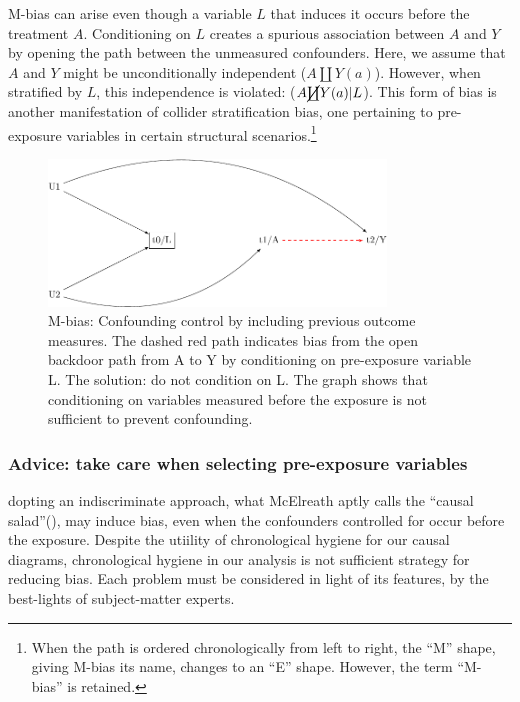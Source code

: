 \documentclass[
  singlecolumn,
  9pt]{article}
\begin{document}
M-bias can arise even though a variable \(L\) that induces it occurs
before the treatment \(A\). Conditioning on \(L\) creates a spurious
association between \(A\) and \(Y\) by opening the path between the
unmeasured confounders. Here, we assume that \(A\) and \(Y\) might be
unconditionally independent (\(A \coprod Y(a)\)). However, when
stratified by \(L\), this independence is violated:
(\(A \cancel{\coprod} Y(a)| L\)). This form of bias is another
manifestation of collider stratification bias, one pertaining to
pre-exposure variables in certain structural scenarios.\footnote{When
  the path is ordered chronologically from left to right, the ``M''
  shape, giving M-bias its name, changes to an ``E'' shape. However, the
  term ``M-bias'' is retained.}

\begin{figure}

{\centering \includegraphics[width=0.8\textwidth,height=\textheight]{causal-dags_files/figure-pdf/fig-m-bias-1.pdf}

}

\caption{\label{fig-m-bias}M-bias: Confounding control by including
previous outcome measures. The dashed red path indicates bias from the
open backdoor path from A to Y by conditioning on pre-exposure variable
L. The solution: do not condition on L. The graph shows that
conditioning on variables measured before the exposure is not sufficient
to prevent confounding.}

\end{figure}

\subsubsection{Advice: take care when selecting pre-exposure
variables}\label{advice-take-care-when-selecting-pre-exposure-variables}

dopting an indiscriminate approach, what McElreath aptly calls the
``causal salad''(), may
induce bias, even when the confounders controlled for occur before the
exposure. Despite the utiility of chronological hygiene for our causal
diagrams, chronological hygiene in our analysis is not sufficient
strategy for reducing bias. Each problem must be considered in light of
its features, by the best-lights of subject-matter experts.
\end{document}
